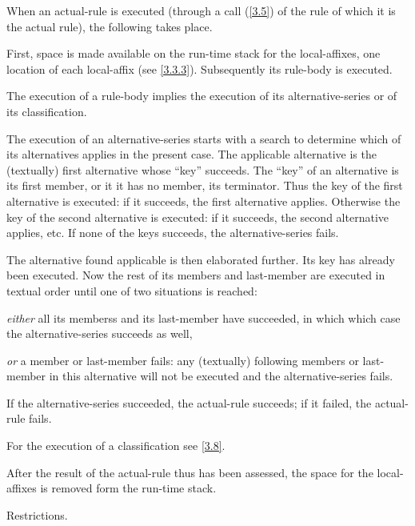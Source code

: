 \documentclass{article}
\newcommand\g[1]{{\sf #1}}
\let\oref\ref
\let\ref\oref
\begin{document}
When an \g{actual-rule} is executed (through a call (\ref{3.5}) of the \g{rule}
of which it is the \g{actual rule}), the following takes place.

First, space is made available on the run-time stack for the 
\g{local-affix}es, one location of each \g{local-affix} (see \ref{3.3.3}). Subsequently its
\g{rule-body} is executed.

The execution of a \g{rule-body} implies the execution of its
\g{alternative-series} or of its \g{classification}.

The execution of an \g{alternative-series} starts with a search to determine
which of its \g{alternative}s applies in the present case. The applicable
\g{alternative} is the (textually) first \g{alternative} whose ``key''
succeeds. The ``key'' of  an \g{alternative} is its first
\g{member}, or it it has no \g{member}, its \g{terminator}.
Thus the key of the first
\g{alternative} is executed: if it succeeds, the first \g{alternative}
applies. Otherwise the key of the second \g{alternative} is
executed: if it succeeds, the second \g{alternative} applies, etc. If none
of the keys succeeds, the \g{alternative-series} fails.

The \g{alternative} found applicable is then elaborated further. Its key 
has already been executed. Now the rest of its \g{member}s and
\g{last-member} are
executed in textual order until one of two situations is reached:

\emph{either} all its \g{members}s and its \g{last-member} have succeeded, in which which case the
\g{alternative-series} succeeds as well,

\emph{or} a member or \g{last-member} fails: any (textually) following \g{member}s 
or \g{last-member} in this
\g{alternative} will not be executed and the \g{alternative-series} fails.

If the \g{alternative-series} succeeded, the \g{actual-rule} succeeds; if
it failed, the \g{actual-rule} fails.

For the execution of a \g{classification} see \ref{3.8}.

After the result of the \g{actual-rule} thus has been assessed, the
space for the \g{local-affix}es is removed form the run-time stack.

\smallskip\noindent
Restrictions.
\end{document}
